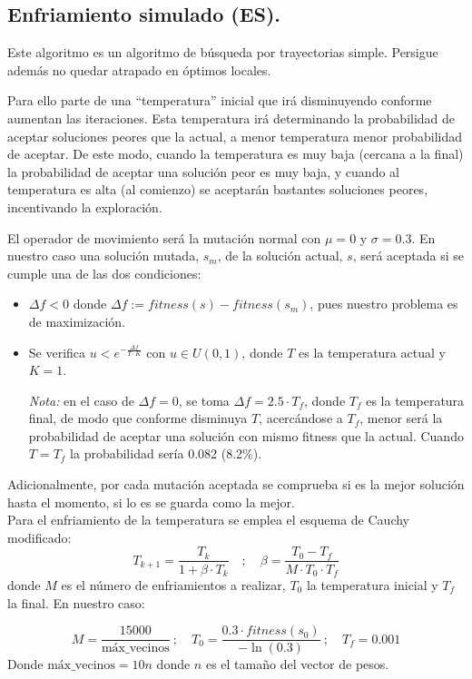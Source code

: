 \documentclass[11pt,a4paper]{article}
\theoremstyle{definition}
\begin{document}
	\subsection{Enfriamiento simulado (ES).}
	Este algoritmo es un algoritmo de búsqueda por trayectorias simple. Persigue además no quedar atrapado en óptimos locales. 
	
	Para ello parte de una ``temperatura'' inicial que irá disminuyendo conforme aumentan las iteraciones. Esta temperatura irá determinando la probabilidad de aceptar soluciones peores que la actual, a menor temperatura menor probabilidad de aceptar. De este modo, cuando la temperatura es muy baja (cercana a la final) la probabilidad de aceptar una solución peor es muy baja, y cuando al temperatura es alta (al comienzo) se aceptarán bastantes soluciones peores, incentivando la exploración.
	
	El operador de movimiento será la mutación normal con $\mu =0$ y $\sigma = 0.3$. En nuestro caso una solución mutada, $s_m$, de la solución actual, $s$, será aceptada si se cumple una de las dos condiciones:
	\begin{itemize}
	\item $\Delta f< 0 $ donde $\Delta f:=fitness(s) - fitness(s_m)$, pues nuestro problema es de maximización.
	\item Se verifica $u<e^{-\frac{\Delta f}{T\cdot K}}$ con $u\in U(0,1)$, donde $T$ es la temperatura actual y $K=1$.
	
	\textit{Nota:} en el caso de $\Delta f=0$, se toma $\Delta f = 2.5\cdot T_f$, donde $T_f$ es la temperatura final, de modo que conforme disminuya $T$, acercándose a $T_f$, menor será la probabilidad de aceptar una solución con mismo fitness que la actual. Cuando $T=T_f$ la probabilidad sería 0.082 (8.2\%). 
	\end{itemize}
	Adicionalmente, por cada mutación aceptada se comprueba si es la mejor solución hasta el momento, si lo es se guarda como la mejor.\\
	
	Para el enfriamiento de la temperatura se emplea el esquema de Cauchy modificado:
	$$T_{k+1}=\frac{T_k}{1+\beta \cdot T_k} \quad ; \quad \beta=\frac{T_0-T_f}{M\cdot T_0 \cdot T_f}$$
	donde $M$ es el número de enfriamientos a realizar, $T_0$ la temperatura inicial y $T_f$ la final. En nuestro caso:
	
	$$M=\frac{15000}{\text{máx\_vecinos}} \ ; \quad T_0=\frac{0.3\cdot fitness(s_0)}{-\ln(0.3)}\ ; \quad T_f=0.001 $$
	Donde $\text{máx\_vecinos} = 10 n$ donde $n$ es el tamaño del vector de pesos. 
	
\end{document}
